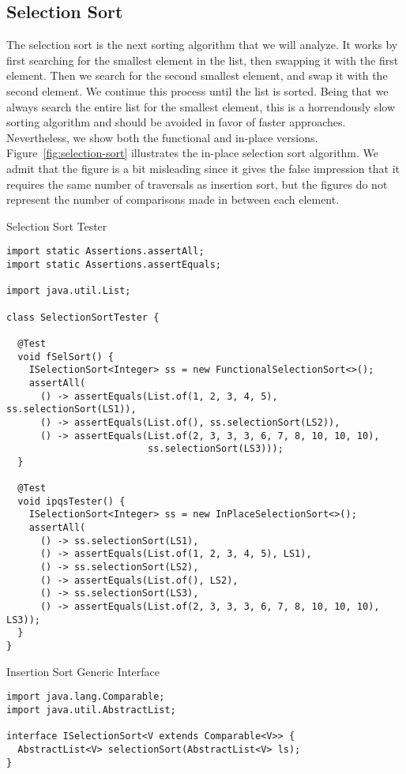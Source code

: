 \subsection{Selection Sort}
The selection sort is the next sorting algorithm that we will analyze. It works by first searching for the smallest element in the list, then swapping it with the first element. Then we search for the second smallest element, and swap it with the second element. We continue this process until the list is sorted. Being that we always search the entire list for the smallest element, this is a horrendously slow sorting algorithm and should be avoided in favor of faster approaches. Nevertheless, we show both the functional and in-place versions. Figure~\ref{fig:selection-sort} illustrates the in-place selection sort algorithm. We admit that the figure is a bit misleading since it gives the false impression that it requires the same number of traversals as insertion sort, but the figures do not represent the number of comparisons made in between each element.

\begin{cl}[]{Selection Sort Tester}
\begin{lstlisting}[language=MyJava]
import static Assertions.assertAll;
import static Assertions.assertEquals;

import java.util.List;

class SelectionSortTester {

  @Test
  void fSelSort() {
    ISelectionSort<Integer> ss = new FunctionalSelectionSort<>();
    assertAll(
      () -> assertEquals(List.of(1, 2, 3, 4, 5), ss.selectionSort(LS1)),
      () -> assertEquals(List.of(), ss.selectionSort(LS2)),
      () -> assertEquals(List.of(2, 3, 3, 3, 6, 7, 8, 10, 10, 10), 
                         ss.selectionSort(LS3)));
  }

  @Test
  void ipqsTester() {
    ISelectionSort<Integer> ss = new InPlaceSelectionSort<>();
    assertAll(
      () -> ss.selectionSort(LS1),
      () -> assertEquals(List.of(1, 2, 3, 4, 5), LS1),
      () -> ss.selectionSort(LS2),
      () -> assertEquals(List.of(), LS2),
      () -> ss.selectionSort(LS3),
      () -> assertEquals(List.of(2, 3, 3, 3, 6, 7, 8, 10, 10, 10), LS3));
  }
}
\end{lstlisting}
\end{cl}

\begin{cl}[]{Insertion Sort Generic Interface}
\begin{lstlisting}[language=MyJava]
import java.lang.Comparable;
import java.util.AbstractList;

interface ISelectionSort<V extends Comparable<V>> {
  AbstractList<V> selectionSort(AbstractList<V> ls);
}
\end{lstlisting}
\end{cl}

